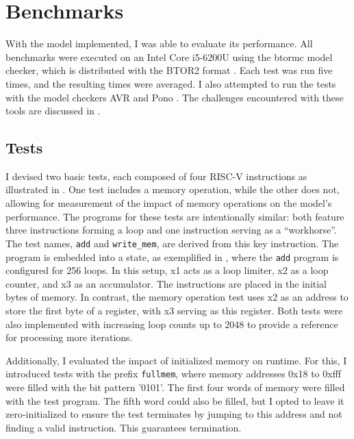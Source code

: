 \chapter{Benchmarks}\label{chap:benchmarks}
With the model implemented, I was able to evaluate its performance.
All benchmarks were executed on an Intel Core i5-6200U using the
btormc model checker, which is distributed with the BTOR2 format
\cite{btor2}. Each test was run five times, and the resulting times
were averaged. I also attempted to run the tests with the model
checkers AVR \cite{avrPaper} and Pono \cite{ponoPaper}. The
challenges encountered with these tools are discussed in
.

\section{Tests}
I devised two basic tests, each composed of four RISC-V instructions
as illustrated in . One test includes a
memory operation, while the other does not, allowing for measurement
of the impact of memory operations on the model's performance. The
programs for these tests are intentionally similar: both feature
three instructions forming a loop and one instruction serving as a
\enquote{workhorse}. The test names, \texttt{add} and
\texttt{write\_mem}, are derived from this key instruction. The
program is embedded into a state, as exemplified in
, where the \texttt{add} program is
configured for 256 loops. In this setup, x1 acts as a loop limiter,
x2 as a loop counter, and x3 as an accumulator. The instructions are
placed in the initial bytes of memory. In contrast, the memory
operation test uses x2 as an address to store the first byte of a
register, with x3 serving as this register. Both tests were also
implemented with increasing loop counts up to 2048 to provide a
reference for processing more iterations.




Additionally, I evaluated the impact of initialized memory on
runtime. For this, I introduced tests with the prefix
\texttt{fullmem}, where memory addresses 0x18 to 0xfff were filled
with the bit pattern '0101'. The first four words of memory were
filled with the test program. The fifth word could also be filled,
but I opted to leave it zero-initialized to ensure the test
terminates by jumping to this address and not finding a valid
instruction. This guarantees termination.

